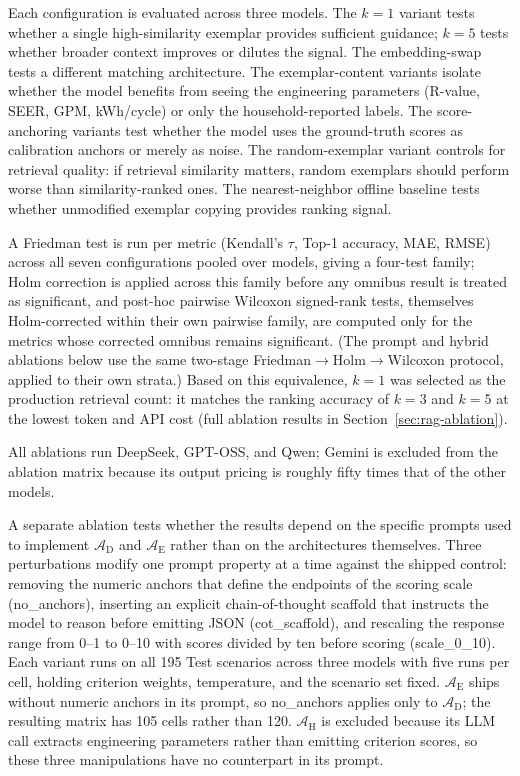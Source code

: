 \documentclass[a4paper,fleqn]{cas-dc}
\begin{document}
Each configuration is evaluated across three models. The $k=1$ variant tests whether a single high-similarity exemplar provides sufficient guidance; $k=5$ tests whether broader context improves or dilutes the signal. The embedding-swap tests a different matching architecture. The exemplar-content variants isolate whether the model benefits from seeing the engineering parameters (R-value, SEER, GPM, kWh/cycle) or only the household-reported labels. The score-anchoring variants test whether the model uses the ground-truth scores as calibration anchors or merely as noise. The random-exemplar variant controls for retrieval quality: if retrieval similarity matters, random exemplars should perform worse than similarity-ranked ones. The nearest-neighbor offline baseline tests whether unmodified exemplar copying provides ranking signal.

A Friedman test is run per metric (Kendall's $\tau$, Top-1 accuracy, MAE, RMSE) across all seven configurations pooled over models, giving a four-test family; Holm correction is applied across this family before any omnibus result is treated as significant, and post-hoc pairwise Wilcoxon signed-rank tests, themselves Holm-corrected within their own pairwise family, are computed only for the metrics whose corrected omnibus remains significant. (The prompt and hybrid ablations below use the same two-stage Friedman$\to$Holm$\to$Wilcoxon protocol, applied to their own strata.) Based on this equivalence, $k=1$ was selected as the production retrieval count: it matches the ranking accuracy of $k=3$ and $k=5$ at the lowest token and API cost (full ablation results in Section~\ref{sec:rag-ablation}).

All ablations run DeepSeek, GPT-OSS, and Qwen; Gemini is excluded from the ablation matrix because its output pricing is roughly fifty times that of the other models.

A separate ablation tests whether the results depend on the specific prompts used to implement $\mathcal{A}_{\text{D}}$ and $\mathcal{A}_{\text{E}}$ rather than on the architectures themselves. Three perturbations modify one prompt property at a time against the shipped control: removing the numeric anchors that define the endpoints of the scoring scale (no\_anchors), inserting an explicit chain-of-thought scaffold that instructs the model to reason before emitting JSON (cot\_scaffold), and rescaling the response range from 0--1 to 0--10 with scores divided by ten before scoring (scale\_0\_10). Each variant runs on all 195 Test scenarios across three models with five runs per cell, holding criterion weights, temperature, and the scenario set fixed. $\mathcal{A}_{\text{E}}$ ships without numeric anchors in its prompt, so no\_anchors applies only to $\mathcal{A}_{\text{D}}$; the resulting matrix has 105 cells rather than 120. $\mathcal{A}_{\text{H}}$ is excluded because its LLM call extracts engineering parameters rather than emitting criterion scores, so these three manipulations have no counterpart in its prompt.
\end{document}
